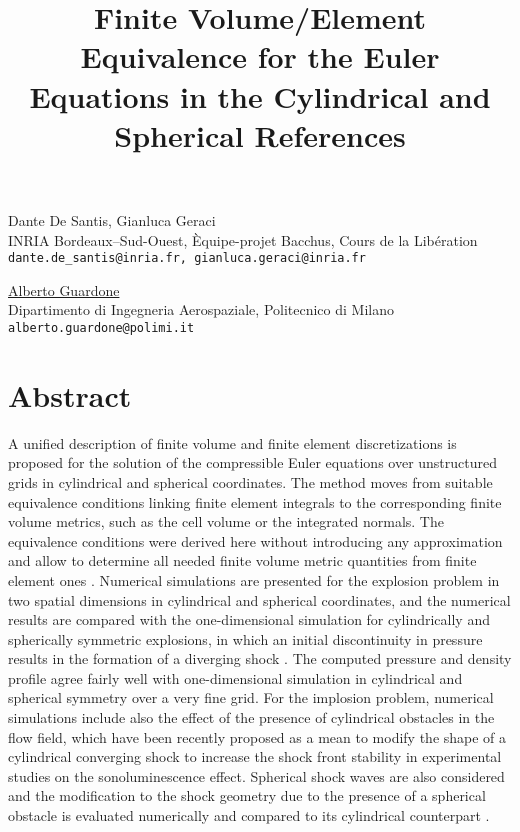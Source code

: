 \title{Finite Volume/Element Equivalence for the Euler Equations in the Cylindrical and Spherical References}
\author{} \institute{}
\maketitle

\begin{center}
{\large Dante De Santis, Gianluca Geraci}\\
INRIA Bordeaux--Sud-Ouest, \`Equipe-projet Bacchus, Cours de la Lib\'eration\\
{\tt dante.de\_santis@inria.fr, gianluca.geraci@inria.fr}\\
\vspace{4mm}

{\large \underline{Alberto Guardone}}\\
Dipartimento di Ingegneria Aerospaziale, Politecnico di Milano\\
{\tt alberto.guardone@polimi.it}
\end{center}

\section*{Abstract}
A unified description of finite volume and finite element discretizations is proposed for the solution of the compressible Euler equations over unstructured grids in cylindrical and spherical coordinates. The method moves from suitable equivalence conditions linking finite element integrals  to the corresponding finite volume metrics, such as the cell volume or the integrated normals. The equivalence conditions were derived here without introducing any approximation and allow to determine all needed finite volume metric quantities from finite element ones \cite{selmin,ddga}. Numerical simulations are presented for the explosion problem in two spatial dimensions in cylindrical and spherical coordinates, and the numerical results are compared with the one-dimensional simulation for cylindrically and spherically symmetric explosions, in which an initial discontinuity in pressure results in the formation of a diverging shock \cite{sedov}. The computed pressure and density profile agree fairly well with one-dimensional simulation in cylindrical and spherical symmetry over a very fine grid. For the implosion problem, numerical simulations include also the effect of the presence of cylindrical obstacles in the flow field, which have been recently proposed as a mean to modify the shape of a cylindrical converging shock to increase the shock front stability in experimental studies on the sonoluminescence effect. Spherical shock waves are also considered and the modification to the shock geometry due to the presence of a spherical obstacle is evaluated numerically and compared to its cylindrical counterpart \cite{chenal}.

